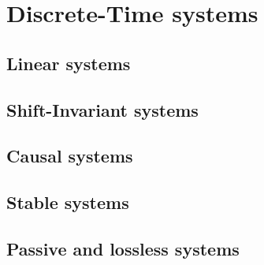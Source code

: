 \documentclass[../../main/main.tex]{subfiles}
\begin{document}
\chapter{Discrete-Time systems}


\section{Linear systems}





\section{Shift-Invariant systems}





\section{Causal systems}





\section{Stable systems}





\section{Passive and lossless systems}
\end{document}
